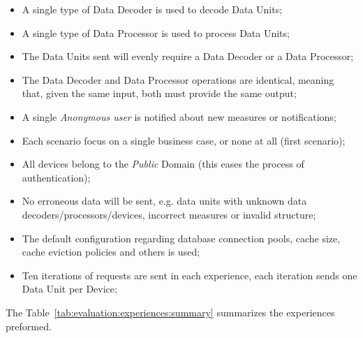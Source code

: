 \begin{itemize}
    \item A single type of Data Decoder is used to decode Data Units;
    \item A single type of Data Processor is used to process Data Units;
    \item The Data Units sent will evenly require a Data Decoder or a Data Processor;
    \item The Data Decoder and Data Processor operations are identical, meaning that, given the same input, both must provide the same output;
    \item A single \textit{Anonymous user} is notified about new measures or notifications;
    \item Each scenario focus on a single business case, or none at all (first scenario);
    \item All devices belong to the \textit{Public} Domain (this eases the process of authentication);
    \item No erroneous data will be sent, e.g. data units with unknown data decoders/processors/devices, incorrect measures or invalid structure;
    \item The default configuration regarding database connection pools, cache size, cache eviction policies and others is used;
    \item Ten iterations of requests are sent in each experience, each iteration sends one Data Unit per Device;
\end{itemize}

The Table~\ref{tab:evaluation:experiences:summary} summarizes the experiences preformed.

